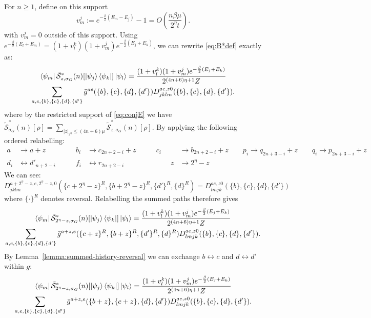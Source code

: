 \documentclass[aps,floatfix,10pt,amssymb,amsfont,amsmath,superscriptaddress,float,nofootinbib,longbibliography,nobalancelastpage,twocolumn]{revtex4-2}
\begin{document}
For $n\geq1$, define on this support
\begin{equation*}
    v_m^j:=e^{-\frac{\beta}{2}(E_m-E_j)}-1=O(\frac{n\beta \mu}{2^{\eta}t}).
\end{equation*}
with $v_m^j=0$ outside of this support. Using $e^{-\frac{\beta}{2}(E_l+E_m)}=(1+v_l^k)(1+v_m^j)e^{-\frac{\beta}{2}(E_j+E_k)}$, we can rewrite \eqref{eq:B*def} exactly as:
\begin{multline}
     \bra{\psi_m}\tilde{\mathcal{S}}^*_{z,\sigma_G}(n)[\ket{\psi_j}\bra{\psi_k}]\ket{\psi_l} = \frac{(1+v_l^k)(1+v_m^j)e^{-\frac{\beta}{2}(E_j+E_k)}}{2^{(4n+6)\eta+1}Z}\\\sum_{a,e,\{b\},\{c\},\{d\},\{d'\}} \bar g^{ae}(\{b\},\{c\},\{d\},\{d'\}) D^{ae,z0}_{jklm}(\{b\},\{c\},\{d\},\{d'\}).
\end{multline}
where by the restricted support of \eqref{eq:conjE} we have $\tilde{\mathcal{S}}^*_{\sigma_G}(n)[\rho] = \sum_{|z|_{2^{\eta}}\leq (4n+6)\mu} \tilde{\mathcal{S}}^*_{z,\sigma_G}(n)[\rho]$.
By applying the following ordered relabelling:
\begin{align}
    a &\rightarrow a+ z &\qquad b_i &\rightarrow c_{2n+2-i} + z\qquad& c_i &\rightarrow b_{2n+2-i} + z  \qquad p_i \rightarrow q_{2n+3-i}+z \qquad q_i \rightarrow p_{2n+3-i} +z\\   d_i &\leftrightarrow d'_{n+2-i} &\qquad f_i &\leftrightarrow r_{2n+2-i} &\qquad z &\rightarrow 2^{\eta} -z
\end{align}
We can see:
\begin{equation*}
   D^{a+2^{\eta}-z,e,2^\eta-z,0}_{jklm}(\{c+2^{\eta}-z\}^R,\{b+2^{\eta}-z\}^R,\{d'\}^R,\{d\}^R) =  D^{ae,z0}_{lmjk}(\{b\},\{c\},\{d\},\{d'\})
\end{equation*}
where $\{\cdot\}^R$ denotes reversal.
Relabelling the summed paths therefore gives
\begin{multline}
     \bra{\psi_m}\tilde{\mathcal{S}}^*_{2^{\eta}-z,\sigma_G}(n)[\ket{\psi_j}\bra{\psi_k}]\ket{\psi_l} = \frac{(1+v_l^k)(1+v_m^j)e^{-\frac{\beta}{2}(E_j+E_k)}}{2^{(4n+6)\eta+1}Z}\\\sum_{a,e,\{b\},\{c\},\{d\},\{d'\}} \bar g^{a+z,e}(\{c+z\}^R,\{b+z\}^R,\{d'\}^R,\{d\}^R) D^{ae,z0}_{lmjk}(\{b\},\{c\},\{d\},\{d'\}).
     \label{eq:relabelline}
\end{multline}
By Lemma~\ref{lemma:summed-history-reversal} we can exchange $b \leftrightarrow c$ and $d \leftrightarrow d'$ within $g$:
\begin{multline}
         \bra{\psi_m}\tilde{\mathcal{S}}^*_{2^{\eta}-z,\sigma_G}(n)[\ket{\psi_j}\bra{\psi_k}]\ket{\psi_l} = \frac{(1+v_l^k)(1+v_m^j)e^{-\frac{\beta}{2}(E_j+E_k)}}{2^{(4n+6)\eta+1}Z}\\\sum_{a,e,\{b\},\{c\},\{d\},\{d'\}} \bar g^{a+z,e}(\{b+z\},\{c+z\},\{d\},\{d'\}) D^{ae,z0}_{lmjk}(\{b\},\{c\},\{d\},\{d'\}).
\end{multline}
\end{document}
